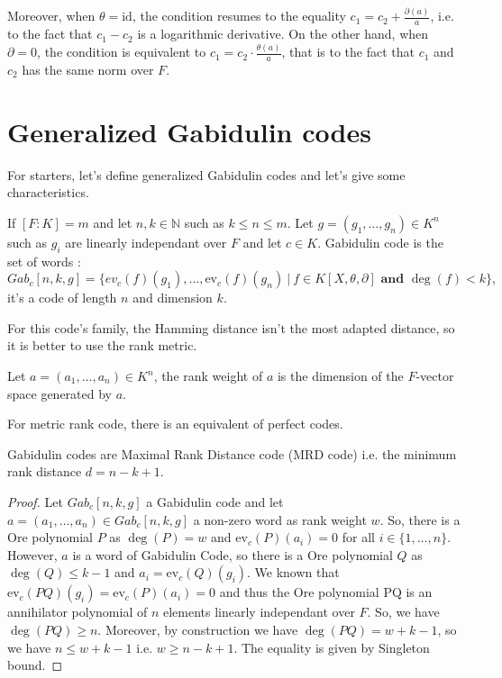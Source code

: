 \documentclass[a4paper]{llncs}
\newcommand{\id}{\textrm{id}}
\newcommand{\ev}[1]{\textrm{ev}_{#1}}
\begin{document}
Moreover, when $\theta = \id$, the condition resumes to the equality 
$c_1 = c_2 + \frac{\partial(a)} a$, i.e. to the fact that $c_1 - c_2$ is 
a logarithmic derivative. On the other hand, when $\partial = 0$, the 
condition is equivalent to $c_1 = c_2 \cdot \frac{\theta(a)}a$, that is 
to the fact that $c_1$ and $c_2$ has the same norm over $F$.



\section{Generalized Gabidulin codes}

For starters, let's define generalized Gabidulin codes and let's give some characteristics.

\begin{definition}
If $[F:K] = m$ and let $n, k \in \mathbb{N}$ such as $k \leqslant n \leqslant m$. Let $g=(g_1, \dots, g_n) \in K^n$ such as $g_i$ are linearly independant over $F$ and let $c \in K$. Gabidulin code is the set of words : 
$$Gab_c[n,k,g] =\{ ev_c(f)(g_1), \dots, \ev{c}(f)(g_n)\ | \ f \in K[X, \theta, \partial] \textbf{ and } \deg(f)<k\},$$
it's a code of length $n$ and dimension $k$.
\end{definition}

For this code's family, the Hamming distance isn't the most adapted distance, so it is better to use the rank metric.

\begin{definition}
Let $a = (a_1, \dots, a_n) \in K^n$, the rank weight of $a$ is the dimension of the $F$-vector space generated by $a$.
\end{definition}

For metric rank code, there is an equivalent of perfect codes. 

\begin{proposition}
Gabidulin codes are Maximal Rank Distance code (MRD code) i.e. the minimum rank distance $d = n-k+1$.
\end{proposition}

\begin{proof}
Let $Gab_c[n,k,g]$ a Gabidulin code and let $a = (a_1, \dots, a_n) \in Gab_c[n,k,g]$ a non-zero word as rank weight $w$. So, there is a Ore polynomial $P$ as $\deg(P) = w$ and $\ev{c}(P)(a_i) = 0$ for all $i \in \{1, \dots, n\}$. However, $a$ is a word of Gabidulin Code, so there is a Ore polynomial $Q$ as $\deg(Q) \leqslant k-1$ and $a_i = \ev{c}(Q)(g_i)$. We known that $\ev{c}(PQ)(g_i) = \ev{c}(P)(a_i) = 0$ and thus the Ore polynomial PQ is an annihilator polynomial of $n$ elements linearly independant over $F$. So, we have $\deg(PQ) \geqslant n$. Moreover, by construction we have $\deg(PQ) = w + k -1$, so we have $n \leqslant w+k-1$ i.e. $w \geqslant n-k+1$. The equality is given by Singleton bound.
\end{proof}
\end{document}
